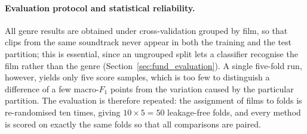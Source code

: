 %
%
%
%

\paragraph{Evaluation protocol and statistical reliability.}
All genre results are obtained under cross-validation grouped by film, so that clips
from the same soundtrack never appear in both the training and the test partition; this
is essential, since an ungrouped split lets a classifier recognise the film rather than
the genre (Section~\ref{sec:fund_evaluation}). A single five-fold run, however, yields only
five score samples, which is too few to distinguish a difference of a few macro-$F_1$
points from the variation caused by the particular partition. The evaluation is
therefore repeated: the assignment of films to folds is re-randomised ten times, giving
$10\times5=50$ leakage-free folds, and every method is scored on exactly the same folds
so that all comparisons are paired.


